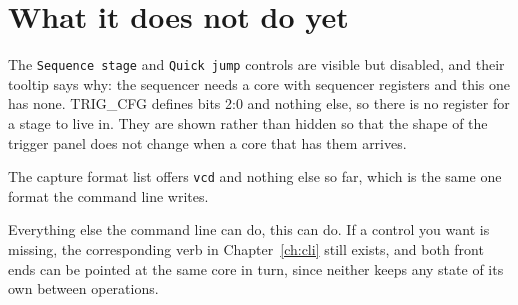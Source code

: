 \documentclass[../manual.tex]{subfiles}
\begin{document}
\section{What it does not do yet}
\label{sec:gui_limits}

The \texttt{Sequence stage} and \texttt{Quick jump} controls are visible but disabled, and their tooltip says why: the sequencer needs a core with sequencer registers and this one has none. TRIG\_CFG defines bits 2:0 and nothing else, so there is no register for a stage to live in. They are shown rather than hidden so that the shape of the trigger panel does not change when a core that has them arrives.

The capture format list offers \texttt{vcd} and nothing else so far, which is the same one format the command line writes.

Everything else the command line can do, this can do. If a control you want is missing, the corresponding verb in Chapter~\ref{ch:cli} still exists, and both front ends can be pointed at the same core in turn, since neither keeps any state of its own between operations.
\end{document}
